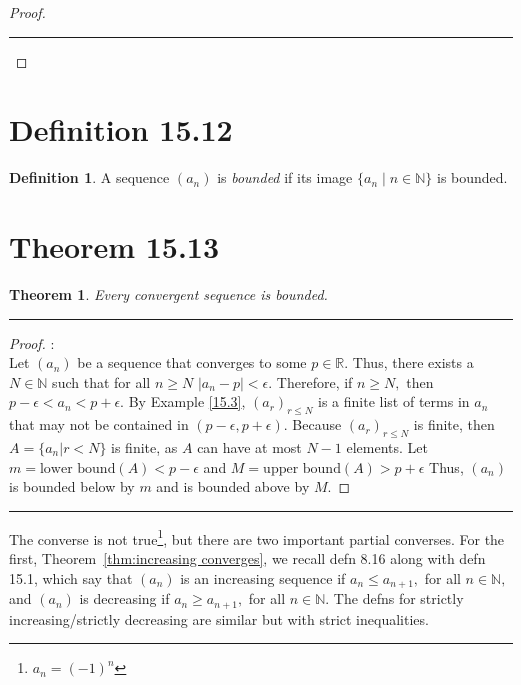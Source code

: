 \documentclass[openany, amssymb, psamsfonts]{amsart}
\newcommand{\bbN}{\mathbb{N}}
\newcommand{\bbR}{\mathbb{R}}
\newtheorem{thm}{Theorem}[section]
\theoremstyle{definition}
\newtheorem{defn}{Definition}[section]
\numberwithin{equation}{section}
\begin{document}
\begin{proof}
\begin{itemize}
\end{itemize}
\vspace{4pt}     \hrule   \vspace{4pt} \end{proof}

\section*{Definition 15.12}
\begin{defn}
\label{15.12}
	A sequence $(a_n)$ is \emph{bounded} if its image $\{a_n \mid n \in \bbN\}$ is bounded.
\end{defn}

\section*{Theorem 15.13}
\begin{thm}
\label{15.13}
	Every convergent sequence is bounded.
\end{thm}
\vspace{4pt}     \hrule   \vspace{4pt} \begin{proof}:\\
Let $(a_n)$ be a sequence that converges to some $p\in \bbR$. Thus, there exists a $N\in \bbN$ such that for all $n\geq N$ $|a_n - p|< \epsilon.$ Therefore, if $n\geq N,$ then $p-\epsilon<a_n < p + \epsilon.$ By Example \ref{15.3}, $(a_r)_{r\leq N}$ is a finite list of terms in $a_n$ that may not be contained in $(p-\epsilon, p+\epsilon).$ Because $(a_r)_{r\leq N}$ is finite, then $A = \{a_n|r<N\}$ is finite, as $A$ can have at most $N-1$ elements. Let $m = \text{lower bound}(A)<p-\epsilon$ and $M = \text{upper bound}(A)>p+\epsilon$ Thus, $(a_n)$ is bounded below by $m$ and is bounded above by $M.$
\end{proof}\vspace{4pt}     \hrule   \vspace{4pt}


The converse is not true\footnote{$a_n = (-1)^n$}, but there are two important partial converses. For the first, Theorem~\ref{thm:increasing converges}, we recall defn 8.16 along with defn 15.1, which say that $(a_n)$ is an increasing sequence if $a_n\leq a_{n+1},$ for all $n\in \bbN,$ and  $(a_n)$ is decreasing if
$a_n\geq a_{n+1},$ for all $n\in \bbN . $ The defns for strictly increasing/strictly decreasing are similar but with strict inequalities.
\end{document}
